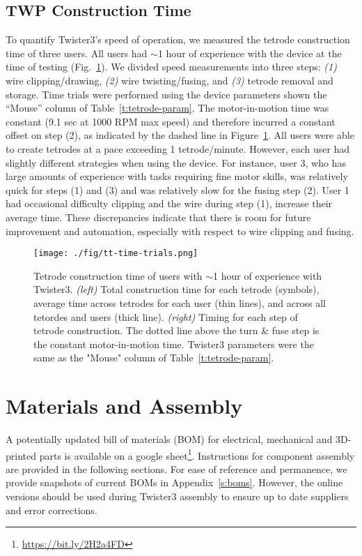 \documentclass[11pt,a4paper]{article}
\begin{document}
\subsection{TWP Construction Time}
To quantify Twister3's speed of operation, we measured the tetrode construction
time of three users. All users had $\sim$1 hour of experience with the device
at the time of testing (Fig.~\ref{f:tt-time}). We divided speed measurements
into three steps: \textit{(1)} wire clipping/drawing, \textit{(2)} wire
twisting/fusing, and \textit{(3)} tetrode removal and storage.  Time trials
were performed using the device parameters shown the ``Mouse'' column of
Table~\ref{t:tetrode-param}. The motor-in-motion time was constant (9.1 sec at
1000 RPM max speed) and therefore incurred a constant offset on step (2), as
indicated by the dashed line in Figure~\ref{f:tt-time}. All users were able to
create tetrodes at a pace exceeding 1 tetrode/minute. However, each user had
slightly different strategies when using the device. For instance, user 3, who
has large amounts of experience with tasks requiring fine motor skills, was
relatively quick for steps (1) and (3) and was relatively slow for the fusing
step (2).  User 1 had occasional difficulty clipping and the wire during step
(1), increase their average time. These discrepancies indicate that there is
room for future improvement and automation, especially with respect to wire
clipping and fusing.

\begin{figure}
\centering
\texttt{[image: ./fig/tt-time-trials.png]}
\caption{
    Tetrode construction time of users with $\sim$1 hour of experience with
    Twister3. \textit{(left)} Total construction time for each tetrode
    (symbols), average time across tetrodes for each user (thin lines), and across all tetordes and users (thick
    line). \textit{(right)} Timing for each step of tetrode construction.
    The dotted line above the turn \& fuse step is the constant motor-in-motion
    time. Twister3 parameters were the same as the "Mouse" column of
    Table~\ref{t:tetrode-param}.
}
\label{f:tt-time}
\end{figure}

\section{Materials and Assembly}
A potentially updated bill of materials (BOM) for electrical, mechanical and
3D-printed parts is available on a google
sheet\footnote{\url{https://bit.ly/2H2a4FD}}. Instructions for component assembly are
provided in the following sections. For ease of reference and permanence, we
provide snapshots of current BOMs in Appendix~\ref{s:boms}. However, the online
versions should be used during Twister3 assembly to ensure up to date suppliers
and error corrections.
\end{document}
